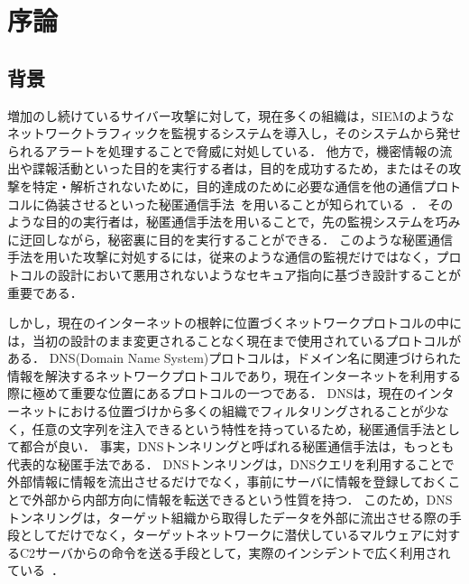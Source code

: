 \section{序論}
\subsection{背景}
増加のし続けているサイバー攻撃に対して，現在多くの組織は，SIEMのようなネットワークトラフィックを監視するシステムを導入し，そのシステムから発せられるアラートを処理することで脅威に対処している．
他方で，機密情報の流出や諜報活動といった目的を実行する者は，目的を成功するため，またはその攻撃を特定・解析されないために，目的達成のために必要な通信を他の通信プロトコルに偽装させるといった秘匿通信手法~\cite{covertchannel}を用いることが知られている~\cite{mitre-custom-c2}．
そのような目的の実行者は，秘匿通信手法を用いることで，先の監視システムを巧みに迂回しながら，秘密裏に目的を実行することができる．
このような秘匿通信手法を用いた攻撃に対処するには，従来のような通信の監視だけではなく，プロトコルの設計において悪用されないようなセキュア指向に基づき設計することが重要である．

しかし，現在のインターネットの根幹に位置づくネットワークプロトコルの中には，当初の設計のまま変更されることなく現在まで使用されているプロトコルがある．
DNS(Domain Name System)プロトコルは，ドメイン名に関連づけられた情報を解決するネットワークプロトコルであり，現在インターネットを利用する際に極めて重要な位置にあるプロトコルの一つである．
DNSは，現在のインターネットにおける位置づけから多くの組織でフィルタリングされることが少なく，任意の文字列を注入できるという特性を持っているため，秘匿通信手法として都合が良い．
事実，DNSトンネリングと呼ばれる秘匿通信手法は，もっとも代表的な秘匿手法である．
DNSトンネリングは，DNSクエリを利用することで外部情報に情報を流出させるだけでなく，事前にサーバに情報を登録しておくことで外部から内部方向に情報を転送できるという性質を持つ．
このため，DNSトンネリングは，ターゲット組織から取得したデータを外部に流出させる際の手段としてだけでなく，ターゲットネットワークに潜伏しているマルウェアに対するC2サーバからの命令を送る手段として，実際のインシデントで広く利用されている~\cite{frameworkpos, bondupdater, bernhardpos, multigrainpos, pisloader, denis, dnsmessenger, udpos}．

